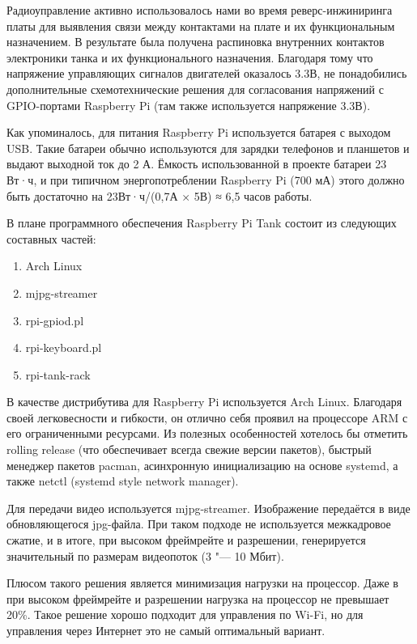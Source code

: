 \documentclass[10pt, a5paper]{article}
\begin{document}
Радиоуправление активно использовалось нами во время реверс-инжиниринга платы для выявления связи между контактами на плате и их функциональным назначением. В результате была получена распиновка внутренних контактов электроники танка и их функционального назначения. Благодаря тому что напряжение управляющих сигналов двигателей оказалось 3.3В, не понадобились дополнительные схемотехнические решения для согласования напряжений с GPIO-портами Raspberry Pi (там также используется напряжение 3.3В).

Как упоминалось, для питания Raspberry Pi используется батарея с выходом USB.  Такие батареи обычно используются для зарядки телефонов и планшетов и выдают выходной ток до 2 А. Ёмкость использованной в проекте батареи 23 Вт·ч, и при типичном энергопотреблении Raspberry Pi (700 мА) этого должно быть достаточно на 23Вт·ч/(0,7А × 5В) ≈ 6,5 часов работы.

В плане программного обеспечения  Raspberry Pi Tank состоит из следующих составных частей:

\begin{enumerate}
  \item Arch Linux
  \item mjpg-streamer
  \item rpi-gpiod.pl
  \item rpi-keyboard.pl
  \item rpi-tank-rack
\end{enumerate}

В качестве дистрибутива для Raspberry Pi используется Arch Linux. Благодаря своей легковесности и гибкости, он отлично себя проявил на процессоре ARM с его ограниченными ресурсами. Из полезных особенностей хотелось бы отметить rolling release (что обеспечивает всегда свежие версии пакетов), быстрый менеджер пакетов pacman, асинхронную инициализацию на основе systemd, а также netctl (systemd style network manager).

Для передачи видео используется mjpg-streamer. Изображение передаётся в виде обновляющегося jpg-файла. При таком подходе не используется межкадровое сжатие, и в итоге, при высоком фреймрейте и разрешении, генерируется значительный по размерам видеопоток (3 "--- 10 Мбит).

Плюсом такого решения является минимизация нагрузки на процессор. Даже в при высоком фреймрейте и разрешении нагрузка на процессор не превышает 20\%. Такое решение хорошо подходит для управления по Wi-Fi, но для управления через Интернет это не самый оптимальный вариант.
\end{document}

